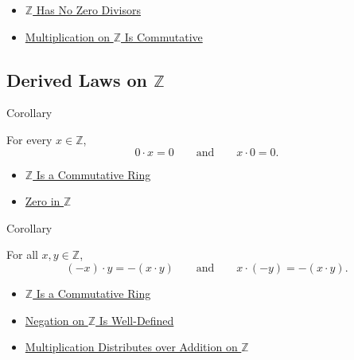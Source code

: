 \begin{dependencies}
\begin{itemize}
  \item \hyperref[thm:z-has-no-zero-divisors]{$\mathbb{Z}$ Has No Zero Divisors}
  \item \hyperref[thm:multiplication-on-z-commutative]{Multiplication on $\mathbb{Z}$ Is Commutative}
\end{itemize}
\end{dependencies}

\subsection*{\texorpdfstring{Derived Laws on $\mathbb{Z}$}{Derived Laws on Z}}

\begin{corollarybox}{Corollary}
\begin{corollary}
\label{cor:zero-absorption-on-z}
For every $x\in\mathbb{Z}$,
\[
0\cdot x=0
\qquad\text{and}\qquad
x\cdot 0=0.
\]
\end{corollary}
\end{corollarybox}

\begin{dependencies}
\begin{itemize}
  \item \hyperref[thm:z-commutative-ring]{$\mathbb{Z}$ Is a Commutative Ring}
  \item \hyperref[def:zero-in-z]{Zero in $\mathbb{Z}$}
\end{itemize}
\end{dependencies}

\begin{corollarybox}{Corollary}
\begin{corollary}
\label{cor:sign-rule-on-z}
For all $x,y\in\mathbb{Z}$,
\[
(-x)\cdot y=-(x\cdot y)
\qquad\text{and}\qquad
x\cdot(-y)=-(x\cdot y).
\]
\end{corollary}
\end{corollarybox}

\begin{dependencies}
\begin{itemize}
  \item \hyperref[thm:z-commutative-ring]{$\mathbb{Z}$ Is a Commutative Ring}
  \item \hyperref[thm:negation-on-z-well-defined]{Negation on $\mathbb{Z}$ Is Well-Defined}
  \item \hyperref[thm:multiplication-distributes-over-addition-on-z]{Multiplication Distributes over Addition on $\mathbb{Z}$}
\end{itemize}
\end{dependencies}

